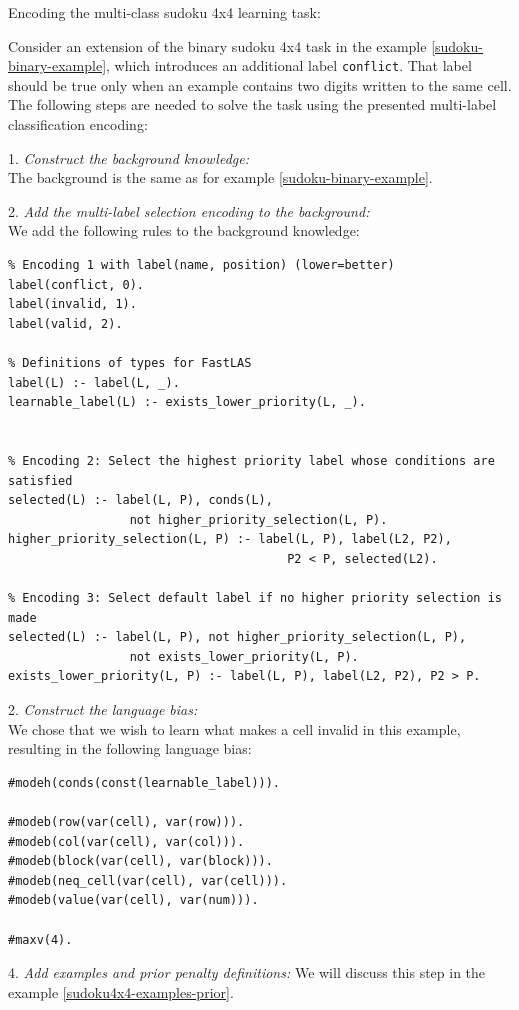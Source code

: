 \begin{example}
Encoding the multi-class sudoku 4x4 learning task:

Consider an extension of the binary sudoku 4x4 task in the example \ref{sudoku-binary-example}, which introduces an additional label \verb_conflict_. 
That label should be true only when an example contains two digits written to the same cell.
The following steps are needed to solve the task using the presented multi-label classification encoding:

1. \textit{Construct the background knowledge:} \\
The background is the same as for example \ref{sudoku-binary-example}.

2. \textit{Add the multi-label selection encoding to the background:} \\
We add the following rules to the background knowledge:
\begin{lstlisting}
% Encoding 1 with label(name, position) (lower=better)
label(conflict, 0).
label(invalid, 1).
label(valid, 2).

% Definitions of types for FastLAS
label(L) :- label(L, _).
learnable_label(L) :- exists_lower_priority(L, _).


% Encoding 2: Select the highest priority label whose conditions are satisfied
selected(L) :- label(L, P), conds(L), 
                 not higher_priority_selection(L, P).
higher_priority_selection(L, P) :- label(L, P), label(L2, P2), 
                                       P2 < P, selected(L2).

% Encoding 3: Select default label if no higher priority selection is made
selected(L) :- label(L, P), not higher_priority_selection(L, P), 
                 not exists_lower_priority(L, P).
exists_lower_priority(L, P) :- label(L, P), label(L2, P2), P2 > P.
\end{lstlisting}

2. \textit{Construct the language bias:} \\
We chose that we wish to learn what makes a cell invalid in this example, resulting in the following language bias:
\begin{verbatim}
#modeh(conds(const(learnable_label))).

#modeb(row(var(cell), var(row))).
#modeb(col(var(cell), var(col))).
#modeb(block(var(cell), var(block))).
#modeb(neq_cell(var(cell), var(cell))).
#modeb(value(var(cell), var(num))).

#maxv(4).
\end{verbatim}

4. \textit{Add examples and prior penalty definitions:}
We will discuss this step in the example \ref{sudoku4x4-examples-prior}.
\end{example}


